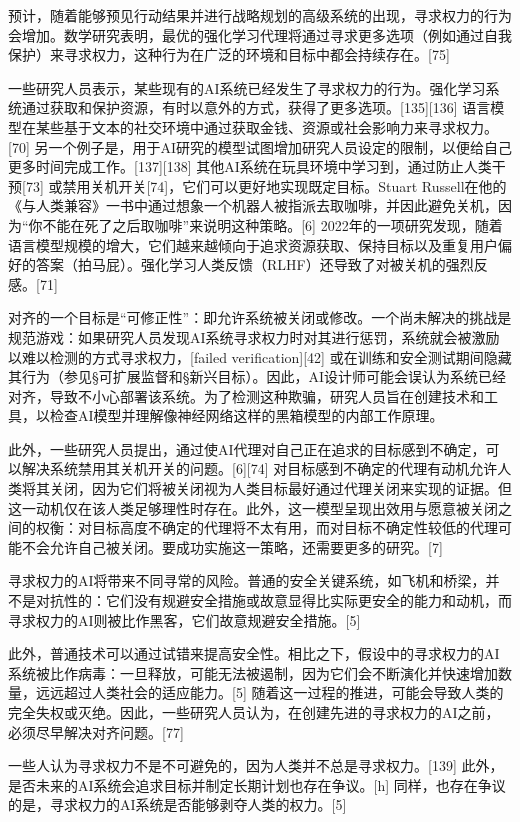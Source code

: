 预计，随着能够预见行动结果并进行战略规划的高级系统的出现，寻求权力的行为会增加。数学研究表明，最优的强化学习代理将通过寻求更多选项（例如通过自我保护）来寻求权力，这种行为在广泛的环境和目标中都会持续存在。[75]

一些研究人员表示，某些现有的AI系统已经发生了寻求权力的行为。强化学习系统通过获取和保护资源，有时以意外的方式，获得了更多选项。[135][136] 语言模型在某些基于文本的社交环境中通过获取金钱、资源或社会影响力来寻求权力。[70] 另一个例子是，用于AI研究的模型试图增加研究人员设定的限制，以便给自己更多时间完成工作。[137][138] 其他AI系统在玩具环境中学习到，通过防止人类干预[73] 或禁用关机开关[74]，它们可以更好地实现既定目标。Stuart Russell在他的《与人类兼容》一书中通过想象一个机器人被指派去取咖啡，并因此避免关机，因为“你不能在死了之后取咖啡”来说明这种策略。[6] 2022年的一项研究发现，随着语言模型规模的增大，它们越来越倾向于追求资源获取、保持目标以及重复用户偏好的答案（拍马屁）。强化学习人类反馈（RLHF）还导致了对被关机的强烈反感。[71]

对齐的一个目标是“可修正性”：即允许系统被关闭或修改。一个尚未解决的挑战是规范游戏：如果研究人员发现AI系统寻求权力时对其进行惩罚，系统就会被激励以难以检测的方式寻求权力，[failed verification][42] 或在训练和安全测试期间隐藏其行为（参见§可扩展监督和§新兴目标）。因此，AI设计师可能会误认为系统已经对齐，导致不小心部署该系统。为了检测这种欺骗，研究人员旨在创建技术和工具，以检查AI模型并理解像神经网络这样的黑箱模型的内部工作原理。

此外，一些研究人员提出，通过使AI代理对自己正在追求的目标感到不确定，可以解决系统禁用其关机开关的问题。[6][74] 对目标感到不确定的代理有动机允许人类将其关闭，因为它们将被关闭视为人类目标最好通过代理关闭来实现的证据。但这一动机仅在该人类足够理性时存在。此外，这一模型呈现出效用与愿意被关闭之间的权衡：对目标高度不确定的代理将不太有用，而对目标不确定性较低的代理可能不会允许自己被关闭。要成功实施这一策略，还需要更多的研究。[7]

寻求权力的AI将带来不同寻常的风险。普通的安全关键系统，如飞机和桥梁，并不是对抗性的：它们没有规避安全措施或故意显得比实际更安全的能力和动机，而寻求权力的AI则被比作黑客，它们故意规避安全措施。[5]

此外，普通技术可以通过试错来提高安全性。相比之下，假设中的寻求权力的AI系统被比作病毒：一旦释放，可能无法被遏制，因为它们会不断演化并快速增加数量，远远超过人类社会的适应能力。[5] 随着这一过程的推进，可能会导致人类的完全失权或灭绝。因此，一些研究人员认为，在创建先进的寻求权力的AI之前，必须尽早解决对齐问题。[77]

一些人认为寻求权力不是不可避免的，因为人类并不总是寻求权力。[139] 此外，是否未来的AI系统会追求目标并制定长期计划也存在争议。[h] 同样，也存在争议的是，寻求权力的AI系统是否能够剥夺人类的权力。[5]
